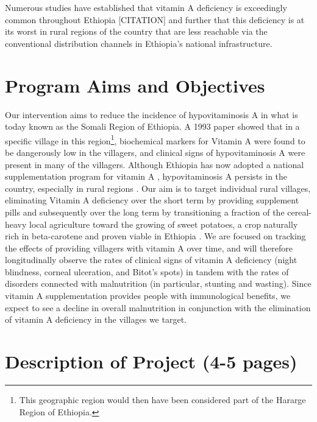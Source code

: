 \documentclass[12pt, letterpaper, draft]{article}
\begin{document}
Numerous studies have established that vitamin A deficiency is exceedingly common throughout Ethiopia [CITATION] and further that this deficiency is at its worst in rural regions of the country that are less reachable via the conventional distribution channels in Ethiopia's national infrastructure.

\section{Program Aims and Objectives} %

Our intervention aims to reduce the incidence of hypovitaminosis A in what is today known as the Somali Region of Ethiopia. A 1993 paper \cite{wolde1993severe} showed that in a specific village in this region\footnote{This geographic region would then have been considered part of the Hararge Region of Ethiopia.}, biochemical markers for Vitamin A were found to be dangerously low in the villagers, and clinical signs of hypovitaminosis A were present in many of the villagers. Although Ethiopia has now adopted a national supplementation program for vitamin A \cite{semba2008coverage}, hypovitaminosis A persists in the country, especially in rural regions \cite{demissie2010magnitude}. Our aim is to target individual rural villages, eliminating Vitamin A deficiency over the short term by providing supplement pills and subsequently over the long term by transitioning a fraction of the cereal-heavy local agriculture toward the growing of sweet potatoes, a crop naturally rich in beta-carotene and proven viable in Ethiopia \cite{belehu2003agronomical}. We are focused on tracking the effects of providing villagers with vitamin A over time, and will therefore longitudinally observe the rates of clinical signs of vitamin A deficiency (night blindness, corneal ulceration, and Bitot's spots) in tandem with the rates of disorders connected with malnutrition (in particular, stunting and wasting). Since vitamin A supplementation provides people with immunological benefits, we expect to see a decline in overall malnutrition in conjunction with the elimination of vitamin A deficiency in the villages we target.



\section{Description of Project (4-5 pages)}
\end{document}
